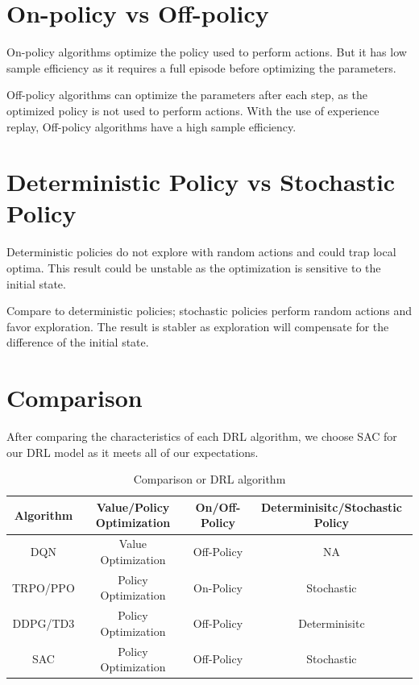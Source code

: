 \section{On-policy vs Off-policy}
On-policy algorithms optimize the policy used to perform actions. But it has low sample efficiency as it requires a full episode before optimizing the parameters. 
\par
Off-policy algorithms can optimize the parameters after each step, as the optimized policy is not used to perform actions.
With the use of experience replay, Off-policy algorithms have a high sample efficiency.
\section{Deterministic Policy vs Stochastic Policy}
Deterministic policies do not explore with random actions and could trap local optima. This result could be unstable as the optimization is sensitive to the initial state.
\par
Compare to deterministic policies; stochastic policies perform random actions and favor exploration. The result is stabler as exploration will compensate for the difference of the initial state.

\section{Comparison}
After comparing the characteristics of each DRL algorithm, we choose SAC for our DRL model as it meets all of our expectations.
\begin{table}[htb]
    \centering
    \begin{tabular}{||c||c|c|c||}
    \hline\hline
        Algorithm & Value/Policy Optimization & On/Off-Policy & Determinisitc/Stochastic Policy  \\ \hline
        DQN	& Value Optimization   & \color{blue} {Off-Policy} & NA \\ \hline
        TRPO/PPO &	\color{blue} {Policy Optimization} &	On-Policy &	\color{blue} {Stochastic} \\ \hline
        DDPG/TD3 &	\color{blue} {Policy Optimization} &	\color{blue} {Off-Policy}  &	Determinisitc \\ \hline
        SAC	& \color{blue} {Policy Optimization} &	\color{blue} {Off-Policy} & \color{blue} {Stochastic} \\ \hline
    \hline\hline
    \end{tabular}
    \caption{Comparison or DRL algorithm}
    \label{tab:my_label}
\end{table}

